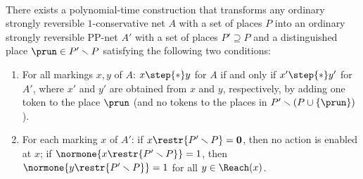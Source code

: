 \begin{prop}\label{prop:constoPP}
\hfill\\	
There exists a polynomial-time construction that transforms
any ordinary strongly reversible $1$-conservative net $A$ with a
set of places $P$ 
into an ordinary strongly reversible PP-net $A'$ with a
	set of places $P'\supseteq P$ and a distinguished place
	$\prun\in P'\smallsetminus P$ satisfying the following two
	conditions:
\begin{enumerate}
	\item		
For all markings $x,y$ of $A$:
		$x \step{*} y$ for $A$ if and only if $x' \step{*} y'$ for
		$A'$, where $x'$ and $y'$ are obtained from $x$ and $y$,
		respectively, by
		adding one token to the place $\prun$ (and no tokens to the
		places in $P'\smallsetminus (P\cup\{\prun\})$).
    \item
For each marking $x$ of $A'$:
		if $x\restr{P'\smallsetminus P}=\mathbf{0}$, then no
		action is enabled at $x$; if 
		$\normone{x\restr{P'\smallsetminus P}}=1$, then  
		$\normone{y\restr{P'\smallsetminus P}}=1$ for all
		$y\in\Reach(x)$.
\end{enumerate}
\end{prop}
